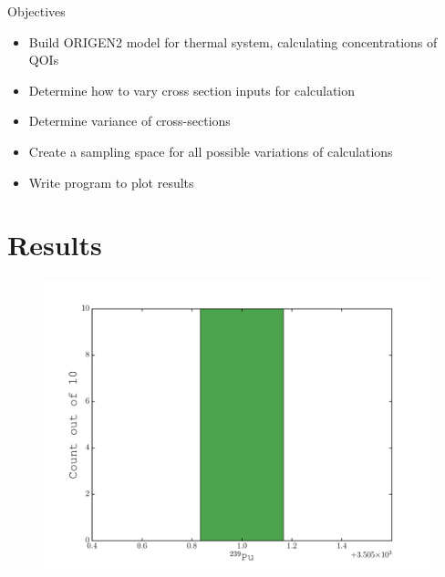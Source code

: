 \documentclass{beamer}
\newcommand{\cmark}{\ding{51}}%
\newcommand{\xmark}{\ding{55}}%
\newcommand{\done}{\rlap{$\square$}{\raisebox{2pt}{\large\hspace{1pt}\cmark}}%
  \hspace{-2.5pt}}
\newcommand{\wontfix}{\rlap{$\square$}{\large\hspace{1pt}\xmark}}
\begin{document}
\begin{frame}
  \begin{block}{Objectives}
  \vspace{0.3cm}
  \begin{itemize}
  \item[\done]{Build ORIGEN2 model for thermal system, calculating
  concentrations of QOIs}
  \item[\wontfix]{Determine how to vary cross section inputs for calculation}
  \item[\done]{Determine variance of cross-sections}
  \item[\done]{Create a sampling space for all possible variations of
    calculations}
  \item[\done]{Write program to plot results}
  \end{itemize}
  \vspace{0.3cm}
\end{block}
\end{frame}

\section{Results}
\begin{frame}
\sectionpage
\end{frame}

\begin{frame}
  \begin{figure}[H]
    \begin{center}
      \hspace*{-0.6cm}\includegraphics[width=1\columnwidth]{../Origen2/PLOTS/PU239Post_HIST.pdf}
      \vspace{-5mm}
      \label{fig:POSTHISTPu239}
    \end{center}
  \end{figure}
\end{frame}
\end{document}
